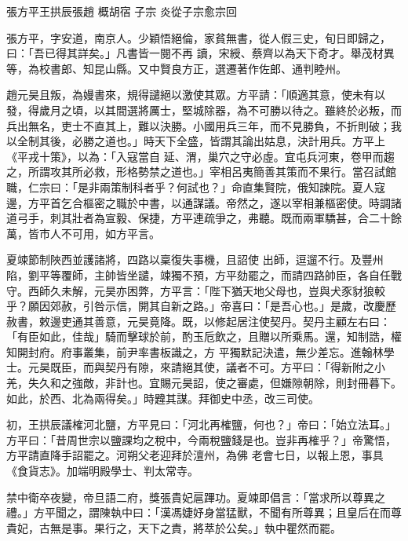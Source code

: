 
\begin{pinyinscope}

 張方平王拱辰張趙
 概胡宿
 子宗
 炎從子宗愈宗回



 張方平，字安道，南京人。少穎悟絕倫，家貧無書，從人假三史，旬日即歸之，曰：「吾已得其詳矣。」凡書皆一閱不再
 讀，宋綬、蔡齊以為天下奇才。舉茂材異等，為校書郎、知昆山縣。又中賢良方正，選遷著作佐郎、通判睦州。



 趙元昊且叛，為嫚書來，規得譴絕以激使其眾。方平請：「順適其意，使未有以發，得歲月之頃，以其間選將厲士，堅城除器，為不可勝以待之。雖終於必叛，而兵出無名，吏士不直其上，難以決勝。小國用兵三年，而不見勝負，不折則破；我以全制其後，必勝之道也。」時天下全盛，皆謂其論出姑息，決計用兵。方平上《平戎十策》，以為：「入寇當自
 延、渭，巢穴之守必虛。宜屯兵河東，卷甲而趨之，所謂攻其所必救，形格勢禁之道也。」宰相呂夷簡善其策而不果行。當召試館職，仁宗曰：「是非兩策制科者乎？何試也？」命直集賢院，俄知諫院。夏人寇邊，方平首乞合樞密之職於中書，以通謀議。帝然之，遂以宰相兼樞密使。時調諸道弓手，刺其壯者為宣毅、保捷，方平連疏爭之，弗聽。既而兩軍驕甚，合二十餘萬，皆市人不可用，如方平言。



 夏竦節制陜西並護諸將，四路以稟復失事機，且詔使
 出師，逗遛不行。及豐州陷，劉平等覆師，主帥皆坐譴，竦獨不預，方平劾罷之，而請四路帥臣，各自任戰守。西師久未解，元昊亦困弊，方平言：「陛下猶天地父母也，豈與犬豕豺狼較乎？願因郊赦，引咎示信，開其自新之路。」帝喜曰：「是吾心也。」是歲，改慶歷赦書，敕邊吏通其善意，元昊竟降。既，以修起居注使契丹。契丹主顧左右曰：「有臣如此，佳哉」騎而擊球於前，酌玉卮飲之，且贈以所乘馬。還，知制誥，權知開封府。府事叢集，前尹率書板識之，方
 平獨默記決遣，無少差忘。進翰林學士。元昊既臣，而與契丹有隙，來請絕其使，議者不可。方平曰：「得新附之小羌，失久和之強敵，非計也。宜賜元昊詔，使之審處，但嫌隙朝除，則封冊暮下。如此，於西、北為兩得矣。」時韙其謀。拜御史中丞，改三司使。



 初，王拱辰議榷河北鹽，方平見曰：「河北再榷鹽，何也？」帝曰：「始立法耳。」方平曰：「昔周世宗以鹽課均之稅中，今兩稅鹽錢是也。豈非再榷乎？」帝驚悟，方平請直降手詔罷之。河朔父老迎拜於澶州，為佛
 老會七日，以報上恩，事具《食貨志》。加端明殿學士、判太常寺。



 禁中衛卒夜變，帝旦語二府，獎張貴妃扈蹕功。夏竦即倡言：「當求所以尊異之禮。」方平聞之，謂陳執中曰：「漢馮婕妤身當猛獸，不聞有所尊異；且皇后在而尊貴妃，古無是事。果行之，天下之責，將萃於公矣。」執中瞿然而罷。




\end{pinyinscope}
